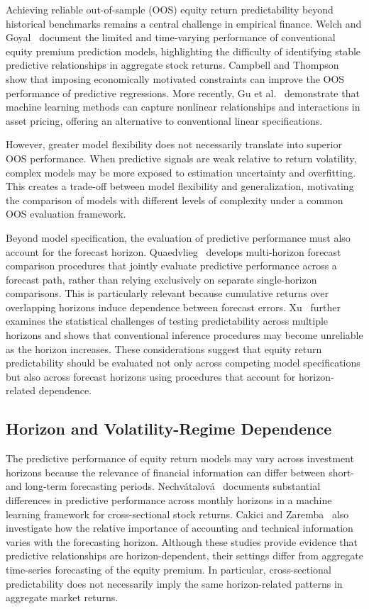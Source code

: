 \documentclass[12pt,twoside]{ord}
\begin{document}
Achieving reliable out-of-sample (OOS) equity return predictability beyond historical benchmarks remains a central challenge in empirical finance. Welch and Goyal~\cite{welch2008} document the limited and time-varying performance of conventional equity premium prediction models, highlighting the difficulty of identifying stable predictive relationships in aggregate stock returns. Campbell and Thompson~\cite{campbell2008} show that imposing economically motivated constraints can improve the OOS performance of predictive regressions. More recently, Gu et al.~\cite{gu2020} demonstrate that machine learning methods can capture nonlinear relationships and interactions in asset pricing, offering an alternative to conventional linear specifications.

However, greater model flexibility does not necessarily translate into superior OOS performance. When predictive signals are weak relative to return volatility, complex models may be more exposed to estimation uncertainty and overfitting. This creates a trade-off between model flexibility and generalization, motivating the comparison of models with different levels of complexity under a common OOS evaluation framework.

Beyond model specification, the evaluation of predictive performance must also account for the forecast horizon. Quaedvlieg~\cite{quaedvlieg2021} develops multi-horizon forecast comparison procedures that jointly evaluate predictive performance across a forecast path, rather than relying exclusively on separate single-horizon comparisons. This is particularly relevant because cumulative returns over overlapping horizons induce dependence between forecast errors. Xu~\cite{xu2020} further examines the statistical challenges of testing predictability across multiple horizons and shows that conventional inference procedures may become unreliable as the horizon increases. These considerations suggest that equity return predictability should be evaluated not only across competing model specifications but also across forecast horizons using procedures that account for horizon-related dependence.

\subsection{Horizon and Volatility-Regime Dependence}

The predictive performance of equity return models may vary across investment horizons because the relevance of financial information can differ between short- and long-term forecasting periods. Nechv{\'a}talov{\'a}~\cite{nechvatalova2024} documents substantial differences in predictive performance across monthly horizons in a machine learning framework for cross-sectional stock returns. Cakici and Zaremba~\cite{cakici2025} also investigate how the relative importance of accounting and technical information varies with the forecasting horizon. Although these studies provide evidence that predictive relationships are horizon-dependent, their settings differ from aggregate time-series forecasting of the equity premium. In particular, cross-sectional predictability does not necessarily imply the same horizon-related patterns in aggregate market returns.
\end{document}

